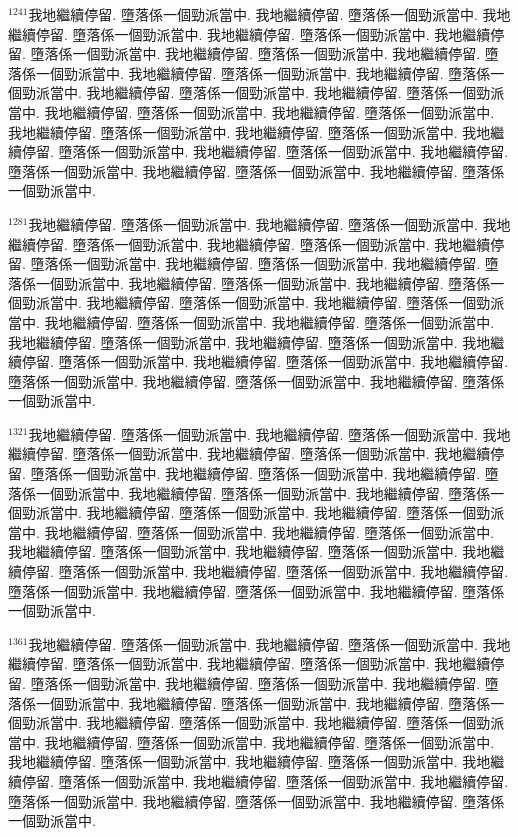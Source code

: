 \documentclass{book}
\begin{document}
$^{1241}$我地繼續停留.
墮落係一個勁派當中.
我地繼續停留.
墮落係一個勁派當中.
我地繼續停留.
墮落係一個勁派當中.
我地繼續停留.
墮落係一個勁派當中.
我地繼續停留.
墮落係一個勁派當中.
我地繼續停留.
墮落係一個勁派當中.
我地繼續停留.
墮落係一個勁派當中.
我地繼續停留.
墮落係一個勁派當中.
我地繼續停留.
墮落係一個勁派當中.
我地繼續停留.
墮落係一個勁派當中.
我地繼續停留.
墮落係一個勁派當中.
我地繼續停留.
墮落係一個勁派當中.
我地繼續停留.
墮落係一個勁派當中.
我地繼續停留.
墮落係一個勁派當中.
我地繼續停留.
墮落係一個勁派當中.
我地繼續停留.
墮落係一個勁派當中.
我地繼續停留.
墮落係一個勁派當中.
我地繼續停留.
墮落係一個勁派當中.
我地繼續停留.
墮落係一個勁派當中.
我地繼續停留.
墮落係一個勁派當中.

$^{1281}$我地繼續停留.
墮落係一個勁派當中.
我地繼續停留.
墮落係一個勁派當中.
我地繼續停留.
墮落係一個勁派當中.
我地繼續停留.
墮落係一個勁派當中.
我地繼續停留.
墮落係一個勁派當中.
我地繼續停留.
墮落係一個勁派當中.
我地繼續停留.
墮落係一個勁派當中.
我地繼續停留.
墮落係一個勁派當中.
我地繼續停留.
墮落係一個勁派當中.
我地繼續停留.
墮落係一個勁派當中.
我地繼續停留.
墮落係一個勁派當中.
我地繼續停留.
墮落係一個勁派當中.
我地繼續停留.
墮落係一個勁派當中.
我地繼續停留.
墮落係一個勁派當中.
我地繼續停留.
墮落係一個勁派當中.
我地繼續停留.
墮落係一個勁派當中.
我地繼續停留.
墮落係一個勁派當中.
我地繼續停留.
墮落係一個勁派當中.
我地繼續停留.
墮落係一個勁派當中.
我地繼續停留.
墮落係一個勁派當中.

$^{1321}$我地繼續停留.
墮落係一個勁派當中.
我地繼續停留.
墮落係一個勁派當中.
我地繼續停留.
墮落係一個勁派當中.
我地繼續停留.
墮落係一個勁派當中.
我地繼續停留.
墮落係一個勁派當中.
我地繼續停留.
墮落係一個勁派當中.
我地繼續停留.
墮落係一個勁派當中.
我地繼續停留.
墮落係一個勁派當中.
我地繼續停留.
墮落係一個勁派當中.
我地繼續停留.
墮落係一個勁派當中.
我地繼續停留.
墮落係一個勁派當中.
我地繼續停留.
墮落係一個勁派當中.
我地繼續停留.
墮落係一個勁派當中.
我地繼續停留.
墮落係一個勁派當中.
我地繼續停留.
墮落係一個勁派當中.
我地繼續停留.
墮落係一個勁派當中.
我地繼續停留.
墮落係一個勁派當中.
我地繼續停留.
墮落係一個勁派當中.
我地繼續停留.
墮落係一個勁派當中.
我地繼續停留.
墮落係一個勁派當中.

$^{1361}$我地繼續停留.
墮落係一個勁派當中.
我地繼續停留.
墮落係一個勁派當中.
我地繼續停留.
墮落係一個勁派當中.
我地繼續停留.
墮落係一個勁派當中.
我地繼續停留.
墮落係一個勁派當中.
我地繼續停留.
墮落係一個勁派當中.
我地繼續停留.
墮落係一個勁派當中.
我地繼續停留.
墮落係一個勁派當中.
我地繼續停留.
墮落係一個勁派當中.
我地繼續停留.
墮落係一個勁派當中.
我地繼續停留.
墮落係一個勁派當中.
我地繼續停留.
墮落係一個勁派當中.
我地繼續停留.
墮落係一個勁派當中.
我地繼續停留.
墮落係一個勁派當中.
我地繼續停留.
墮落係一個勁派當中.
我地繼續停留.
墮落係一個勁派當中.
我地繼續停留.
墮落係一個勁派當中.
我地繼續停留.
墮落係一個勁派當中.
我地繼續停留.
墮落係一個勁派當中.
我地繼續停留.
墮落係一個勁派當中.
\end{document}
